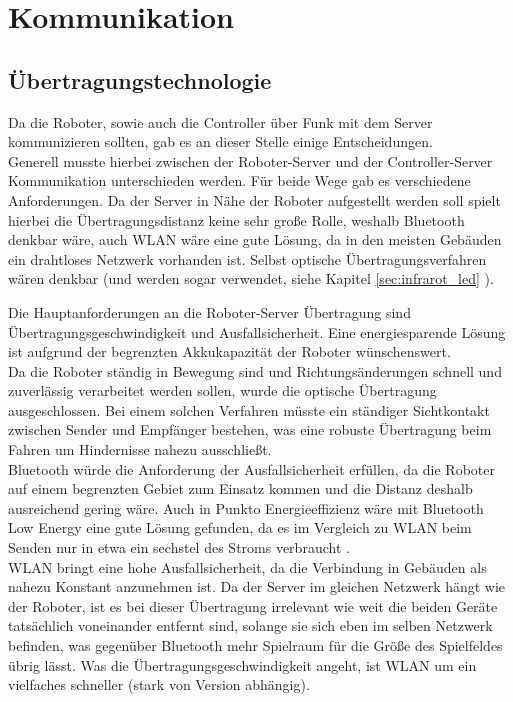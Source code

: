 \chapter{Kommunikation}
\label{sec:kommunikation}

\section{Übertragungstechnologie}
Da die Roboter, sowie auch die Controller über Funk mit dem Server kommunizieren sollten, gab es an dieser Stelle einige Entscheidungen. \\
Generell musste hierbei zwischen der Roboter-Server und der Controller-Server Kommunikation unterschieden werden. Für beide Wege gab es verschiedene Anforderungen. 
Da der Server in Nähe der Roboter aufgestellt werden soll spielt hierbei die Übertragungsdistanz keine sehr große Rolle, weshalb Bluetooth denkbar wäre, auch WLAN wäre eine gute Lösung, da in den meisten Gebäuden ein drahtloses Netzwerk vorhanden ist. Selbst optische Übertragungsverfahren wären denkbar (und werden sogar verwendet, siehe Kapitel \ref{sec:infrarot_led}
).

Die Hauptanforderungen an die Roboter-Server Übertragung sind Übertragungsgeschwindigkeit und Ausfallsicherheit. Eine energiesparende Lösung ist aufgrund der begrenzten Akkukapazität der Roboter wünschenswert. \\
Da die Roboter ständig in Bewegung sind und Richtungsänderungen schnell und zuverlässig verarbeitet werden sollen, wurde die optische Übertragung ausgeschlossen. Bei einem solchen Verfahren müsste ein ständiger Sichtkontakt zwischen Sender und Empfänger bestehen, was eine robuste Übertragung beim Fahren um Hindernisse nahezu ausschließt. \\
 Bluetooth würde die Anforderung der Ausfallsicherheit erfüllen, da die Roboter auf einem begrenzten Gebiet zum Einsatz kommen und die Distanz deshalb ausreichend gering wäre. Auch in Punkto Energieeffizienz wäre mit Bluetooth Low Energy eine gute Lösung gefunden, da es im Vergleich zu WLAN beim Senden nur in etwa ein sechstel des Stroms verbraucht %
. \\
WLAN bringt eine hohe Ausfallsicherheit, da die Verbindung in Gebäuden als nahezu Konstant anzunehmen ist. Da der Server im gleichen Netzwerk hängt wie der Roboter, ist es bei dieser Übertragung irrelevant wie weit die beiden Geräte tatsächlich voneinander entfernt sind, solange sie sich eben im selben Netzwerk befinden, was gegenüber Bluetooth mehr Spielraum für die Größe des Spielfeldes übrig lässt. Was die Übertragungsgeschwindigkeit angeht, ist WLAN um ein vielfaches schneller (stark von Version abhängig). \\

